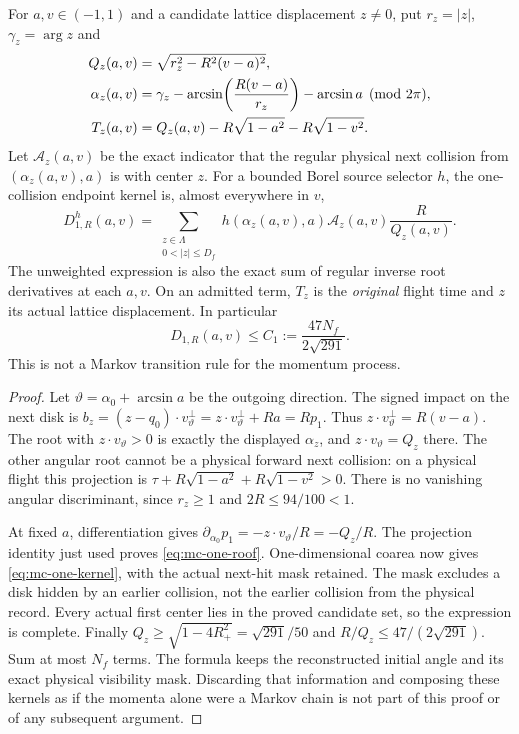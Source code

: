 \begin{lemma}
\label{lem:mc-oneflight}
For $a,v\in(-1,1)$ and a candidate lattice displacement
$z\ne0$, put $r_z=|z|$, $\gamma_z=\arg z$ and
\begin{align}
 Q_z(a,v)&=\sqrt{r_z^2-R^2(v-a)^2},\label{eq:mc-Qz}\\
 \alpha_z(a,v)&=\gamma_z-
        \arcsin\!\left(\frac{R(v-a)}{r_z}\right)-\arcsin a
                                                    \pmod{2\pi},\notag\\
 T_z(a,v)&=Q_z(a,v)-R\sqrt{1-a^2}-R\sqrt{1-v^2}.
                                                    \label{eq:mc-one-roof}
\end{align}
Let $\mathcal A_z(a,v)$ be the exact indicator that the regular
physical next collision from $(\alpha_z(a,v),a)$ is with center $z$.
For a bounded Borel source selector $h$, the one-collision endpoint
kernel is, almost everywhere in $v$,
\begin{equation}\label{eq:mc-one-kernel}
 D^h_{1,R}(a,v)=
 \sum_{\substack{z\in\Lambda\\0<|z|\le D_f}}
 h(\alpha_z(a,v),a)\mathcal A_z(a,v)\frac{R}{Q_z(a,v)}.
\end{equation}
The unweighted expression is also the exact sum of regular inverse
root derivatives at each $a,v$. On an admitted term, $T_z$ is the
\emph{original} flight time and $z$ its actual lattice displacement.
In particular
\begin{equation}\label{eq:mc-one-C}
 D_{1,R}(a,v)\le C_1:=\frac{47N_f}{2\sqrt{291}}.
\end{equation}
This is not a Markov transition rule for the momentum process.
\end{lemma}
\begin{proof}
Let $\vartheta=\alpha_0+\arcsin a$ be the outgoing direction.
The signed impact on the next disk is
$b_z=(z-q_0)\cdot v_\vartheta^\perp
     =z\cdot v_\vartheta^\perp+Ra=R p_1$.
Thus $z\cdot v_\vartheta^\perp=R(v-a)$.
The root with $z\cdot v_\vartheta>0$ is exactly the displayed
$\alpha_z$, and $z\cdot v_\vartheta=Q_z$ there. The other angular
root cannot be a physical forward next collision: on a physical
flight this projection is $\tau+R\sqrt{1-a^2}+R\sqrt{1-v^2}>0$.
There is no vanishing angular discriminant, since
$r_z\ge1$ and $2R\le94/100<1$.

At fixed $a$, differentiation gives
$\partial_{\alpha_0}p_1=-z\cdot v_\vartheta/R=-Q_z/R$.
The projection identity just used proves \eqref{eq:mc-one-roof}.
One-dimensional coarea now gives \eqref{eq:mc-one-kernel}, with the
actual next-hit mask retained. The mask excludes a disk hidden by
an earlier collision, not the earlier collision from the physical
record. Every actual first center lies in the proved candidate set,
so the expression is complete. Finally
$Q_z\ge\sqrt{1-4R_+^2}=\sqrt{291}/50$ and
$R/Q_z\le47/(2\sqrt{291})$. Sum at most $N_f$ terms.
The formula keeps the reconstructed initial angle and its exact
physical visibility mask. Discarding that information and composing
these kernels as if the momenta alone were a Markov chain is not
part of this proof or of any subsequent argument.
\end{proof}

